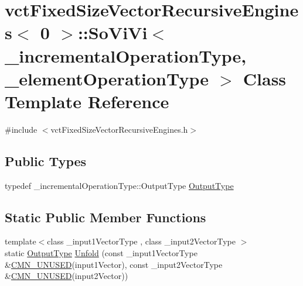\hypertarget{classvct_fixed_size_vector_recursive_engines_3_010_01_4_1_1_so_vi_vi}{}\section{vct\+Fixed\+Size\+Vector\+Recursive\+Engines$<$ 0 $>$\+:\+:So\+Vi\+Vi$<$ \+\_\+incremental\+Operation\+Type, \+\_\+element\+Operation\+Type $>$ Class Template Reference}
\label{classvct_fixed_size_vector_recursive_engines_3_010_01_4_1_1_so_vi_vi}


{\ttfamily \#include $<$vct\+Fixed\+Size\+Vector\+Recursive\+Engines.\+h$>$}

\subsection*{Public Types}
\begin{DoxyCompactItemize}
\item 
typedef \+\_\+incremental\+Operation\+Type\+::\+Output\+Type \hyperlink{classvct_fixed_size_vector_recursive_engines_3_010_01_4_1_1_so_vi_vi_a0bad367055cb0c9d0e6c3f5521b0463b}{Output\+Type}
\end{DoxyCompactItemize}
\subsection*{Static Public Member Functions}
\begin{DoxyCompactItemize}
\item 
{\footnotesize template$<$class \+\_\+input1\+Vector\+Type , class \+\_\+input2\+Vector\+Type $>$ }\\static \hyperlink{classvct_fixed_size_vector_recursive_engines_3_010_01_4_1_1_so_vi_vi_a0bad367055cb0c9d0e6c3f5521b0463b}{Output\+Type} \hyperlink{classvct_fixed_size_vector_recursive_engines_3_010_01_4_1_1_so_vi_vi_a86320bb2a18ee270b0b10cfe7fe6a4e4}{Unfold} (const \+\_\+input1\+Vector\+Type \&\hyperlink{cmn_portability_8h_a021894e2626935fa2305434b1e893ff6}{C\+M\+N\+\_\+\+U\+N\+U\+S\+E\+D}(input1\+Vector), const \+\_\+input2\+Vector\+Type \&\hyperlink{cmn_portability_8h_a021894e2626935fa2305434b1e893ff6}{C\+M\+N\+\_\+\+U\+N\+U\+S\+E\+D}(input2\+Vector))
\end{DoxyCompactItemize}


